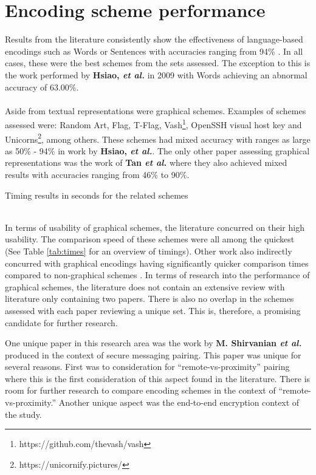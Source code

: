 \section*{Encoding scheme performance}
Results 
from the literature consistently show the effectiveness of language-based encodings such as Words or Sentences with accuracies ranging from 94\% \cite{dechand2016empirical}\cite{tan2017can}\cite{kainda2009usability}. In all cases, these were the best schemes from the sets assessed. The exception to this is the work performed by \textbf{Hsiao, \textit{et al.}}\cite{hsiao2009study} in 2009 with Words achieving an abnormal accuracy of 63.00\%.
\\\\
Aside from textual representations were graphical schemes. Examples of schemes assessed were: Random Art\cite{perrig1999hash}, Flag\cite{ellison2003public}, T-Flag\cite{lin2010spate}, Vash\footnote{https://github.com/thevash/vash}, OpenSSH visual host key and Unicorns\footnote{https://unicornify.pictures/}, among others. These schemes had mixed accuracy with ranges as large as 50\% - 94\% in work by \textbf{Hsiao, \textit{et al.}}\cite{hsiao2009study}. The only other paper assessing graphical representations was the work of \textbf{Tan \textit{et al.}}\cite{tan2017can} where they also achieved mixed results with accuracies ranging from 46\% to 90\%.
\\
\begin{table}[h!]
    \makebox[\textwidth][c]{
        
    }%
    \caption{Timing results in seconds for the related schemes}
    \label{tab:times}
\end{table}
\\
In terms of usability of graphical schemes, the literature concurred on their high usability. The comparison speed of these schemes were all among the quickest (See Table \ref{tab:times} for an overview of timings). Other work also indirectly concurred with graphical encodings having significantly quicker comparison times compared to non-graphical schemes \cite{dechand2016empirical}\cite{kainda2009usability}.
In terms of research into the performance of graphical schemes, the literature does not contain an extensive review with literature only containing two papers. There is also no overlap in the schemes assessed with each paper reviewing a unique set. This is, therefore, a promising candidate for further research.

One unique paper in this research area was the work by \textbf{M. Shirvanian \textit{et al.}}\cite{shirvanian2017pitfalls} produced in the context of secure messaging pairing. This paper was unique for several reasons. First was to consideration for ``remote-vs-proximity'' pairing where this is the first consideration of this aspect found in the literature. There is room for further research to compare encoding schemes in the context of ``remote-vs-proximity.'' Another unique aspect was the end-to-end encryption context of the study.

